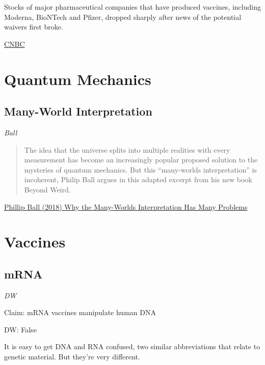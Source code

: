 \documentclass[
]{book}
\begin{document}
Stocks of major pharmaceutical companies that have produced vaccines, including Moderna, BioNTech and Pfizer, dropped sharply after news of the potential waivers first broke.

\href{https://www.cnbc.com/2021/05/05/us-backs-covid-vaccine-intellectual-property-waivers-to-expand-access-to-shots-worldwide.html}{CNBC}

\hypertarget{quantum-mechanics}{%
\chapter{Quantum Mechanics}\label{quantum-mechanics}}

\hypertarget{many-world-interpretation}{%
\section{Many-World Interpretation}\label{many-world-interpretation}}

\emph{Ball}

\begin{quote}
The idea that the universe splits into multiple realities with every measurement has become an increasingly popular proposed solution to the mysteries of quantum mechanics. But this ``many-worlds interpretation'' is incoherent, Philip Ball argues in this adapted excerpt from his new book Beyond Weird.
\end{quote}

\href{https://www.quantamagazine.org/why-the-many-worlds-interpretation-of-quantum-mechanics-has-many-problems-20181018/}{Phillip Ball (2018) Why the Many-Worlds Interpretation Has Many Problems}

\hypertarget{vaccines}{%
\chapter{Vaccines}\label{vaccines}}

\hypertarget{mrna}{%
\section{mRNA}\label{mrna}}

\emph{DW}

Claim: mRNA vaccines manipulate human DNA

DW: False

It is easy to get DNA and RNA confused, two similar abbreviations that relate to genetic material. But they're very different.
\end{document}
